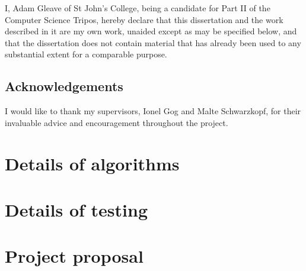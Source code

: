 \documentclass[12pt,a4paper,twoside,notitlepage]{report}
\theoremstyle{plain}
\theoremstyle{definition}
\theoremstyle{remark}
\begin{document}
I, Adam Gleave of St John's College, being a candidate for Part II of the 
Computer Science Tripos, hereby declare that this dissertation and the work 
described in it are my own work, unaided except as may be specified below, and
that the dissertation does not contain material that has already been used to
any substantial extent for a comparable purpose.

\bigskip
{}
\medskip

\clearpage

\tableofcontents

\listofalgorithms
\listoftables
\listoffigures

\newpage
\section*{Acknowledgements}

I would like to thank my supervisors, Ionel Gog and Malte Schwarzkopf, for their invaluable advice and encouragement throughout the project.

\clearpage	%

\setcounter{page}{1}
\pagestyle{headings}



\cleardoublepage


\cleardoublepage


\cleardoublepage


\cleardoublepage


\cleardoublepage

\printbibliography[heading=bibintoc,category=cited]

\printbibliography[title={WARNING: Uncited},notcategory=cited]


\appendix
\chapter{Details of algorithms} \label{appendix:impl}


\chapter{Details of testing} \label{appendix:test}


\chapter{Project proposal} \label{appendix:proposal}

\end{document}
